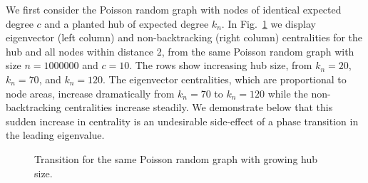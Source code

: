 \documentclass[twocolumn,prl,superscriptaddress]{revtex4}
\begin{document}
We first consider the Poisson random graph with nodes of identical expected degree $c$ and a planted hub of expected degree $k_n$. In Fig.~\ref{fig:transition} we display eigenvector (left column) and non-backtracking (right column) centralities for the hub and all nodes within distance 2, from the same Poisson random graph with size $n=1000000$ and $c = 10$. The rows show increasing hub size, from $k_n = 20$, $k_n = 70$, and $k_n = 120$. The eigenvector centralities, which are proportional to node areas, increase dramatically from $k_n = 70$ to $k_n = 120$ while the non-backtracking centralities increase steadily. We demonstrate below that this sudden increase in centrality is an undesirable side-effect of a phase transition in the leading eigenvalue.


\begin{figure}
\begin{center}
\end{center}
\caption{Transition for the same Poisson random graph with growing hub size.}
\label{fig:transition}
\end{figure}
\end{document}
